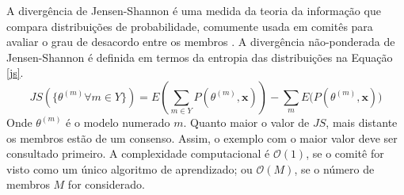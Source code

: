 %


A divergência de Jensen-Shannon \cite{journals/tit/Lin91} é uma medida da teoria da informação
que compara distribuições de probabilidade, comumente usada em comitês para
avaliar o grau de desacordo entre os membros \cite{Melville:2004:DEA:1015330.1015385}.
A divergência não-ponderada de Jensen-Shannon é definida em termos da entropia das distribuições
na Equação \ref{js}.
\begin{equation}\label{js}
 JS(\{\theta^{(m)} \forall m \in Y\}) = E(\sum_{m \in Y}{P(\theta^{(m)},\bm{x})}) - \sum_m{E(P(\theta^{(m)},\bm{x})})
\end{equation}
Onde $\theta^{(m)}$ é o modelo numerado $m$.
Quanto maior o valor de $JS$, mais distante os membros estão de um consenso.
Assim, o exemplo com o maior valor deve ser consultado primeiro.
A complexidade computacional é $\mathcal{O}(1)$,
se o comitê for visto como um único algoritmo de aprendizado;
ou $\mathcal{O}(M)$, se o número de membros $M$ for considerado.

